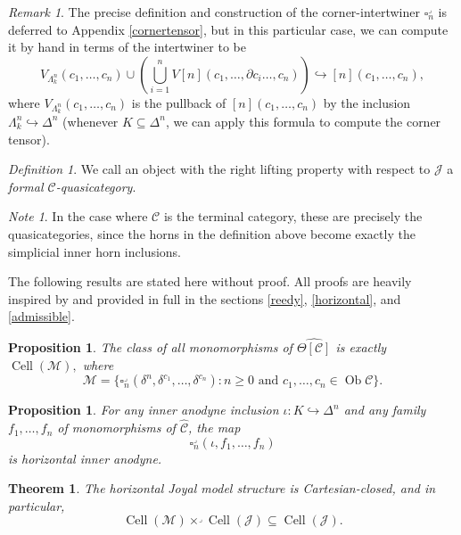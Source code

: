 \documentclass[leqno]{article}
\numberwithin{equation}{subsection}
\theoremstyle{plain}   %
\newtheorem{thm}[equation]{Theorem}
\newtheorem{prop}[equation]{Proposition}
\theoremstyle{remark}
\newtheorem{rem}[equation]{Remark}
\newtheorem{note}[equation]{Note}
\newtheorem{defn}[equation]{Definition}
\theoremstyle{plain}
\DeclareMathOperator{\Ob}{Ob}
\newcommand{\psh}[1]{\ensuremath{\widehat{#1}}}
\renewcommand{\C}{\ensuremath{\mathcal{C}}}
\newcommand{\cellset}{\ensuremath{\widehat{\Theta[\mathcal{C}]}}}
\begin{document}
\begin{rem}
	The precise definition and construction of the corner-intertwiner \(\square^\lrcorner_n\) is deferred to Appendix \ref{cornertensor}, but in this particular case, we can compute it by hand in terms of the intertwiner to be \[V_{\Lambda^n_k}(c_1,\dots,c_n) \cup \left(\bigcup_{i=1}^n V[n](c_1,\dots,\partial c_i \dots, c_n) \right) \hookrightarrow [n](c_1,\dots,c_n),\] where \(V_{\Lambda^n_k}(c_1,\dots,c_n)\) is the pullback of \([n](c_1,\dots,c_n)\) by the inclusion \(\Lambda^n_k\hookrightarrow \Delta^n\) (whenever \(K\subseteq \Delta^n\), we can apply this formula to compute the corner tensor).
\end{rem}

\begin{defn}
	We call an object with the right lifting property with respect to \(\mathscr{J}\) a \emph{formal \(\C\)-quasicategory}.
\end{defn}

\begin{note} 
	In the case where \(\C\) is the terminal category, these are precisely the quasicategories, since the horns in the definition above become exactly the simplicial inner horn inclusions.
\end{note}

The following results are stated here without proof.  All proofs are heavily inspired by \cite{oury} and provided in full in the sections \ref{reedy}, \ref{horizontal}, and \ref{admissible}.

\begin{prop}
	The class of all monomorphisms of \(\cellset\) is exactly \(\operatorname{Cell}(\mathscr{M}),\) where \[\mathscr{M}=\{\square_n^\lrcorner(\delta^n,\delta^{c_1},\dots,\delta^{c_n}) : n\geq 0 \text{ and } c_1,\dots,c_n \in \Ob \C\}.\]
\end{prop}

\begin{prop}
	For any inner anodyne inclusion \(\iota:K\hookrightarrow \Delta^n\) and any family \(f_1,\dots,f_n\) of monomorphisms of \(\psh{\C}\), the map \[\square^\lrcorner_n(\iota,f_1,\dots,f_n)\] is horizontal inner anodyne.
\end{prop}

\begin{thm} The horizontal Joyal model structure is Cartesian-closed, and in particular, \[\operatorname{Cell}(\mathscr{M})\times^\lrcorner \operatorname{Cell}(\mathscr{J}) \subseteq \operatorname{Cell}(\mathscr{J}).\]
\end{thm}
\end{document}

